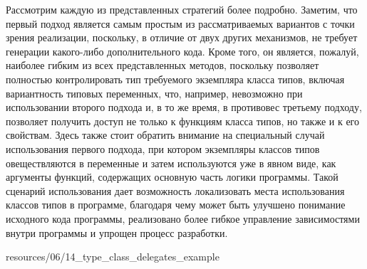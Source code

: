 Рассмотрим каждую из представленных стратегий более подробно. Заметим, что первый подход является самым простым из рассматриваемых вариантов с точки зрения реализации, поскольку, в отличие от двух других механизмов, не требует генерации какого-либо дополнительного кода. Кроме того, он является, пожалуй, наиболее гибким из всех представленных методов, поскольку позволяет полностью контролировать тип требуемого экземпляра класса типов, включая вариантность типовых переменных, что, например, невозможно при использовании второго подхода и, в то же время, в противовес третьему подходу, позволяет получить доступ не только к функциям класса типов, но также и к его свойствам. Здесь также стоит обратить внимание на специальный случай использования первого подхода, при котором экземпляры классов типов овеществляются в переменные и затем используются уже в явном виде, как аргументы функций, содержащих основную часть логики программы.  Такой сценарий использования дает возможность локализовать места использования классов типов в программе, благодаря чему может быть улучшено понимание исходного кода программы, реализовано более гибкое управление зависимостями внутри программы и упрощен процесс разработки. 


{resources/06/14_type_class_delegates_example}

